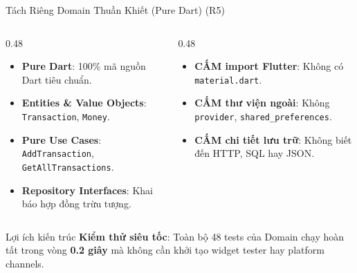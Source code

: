 \documentclass[aspectratio=169, 10pt]{beamer}
\newcommand{\speakerB}{\hfill\tcbox[colback=NavyPrimary,colframe=NavyPrimary,boxsep=1pt,left=3pt,right=3pt,top=1pt,bottom=1pt]{\tiny\bfseries\color{white}SV B: Phạm Nhung}}
\begin{document}
\begin{frame}{Tách Riêng Domain Thuần Khiết (Pure Dart) (R5) \speakerB}
  \begin{columns}[T]
    \begin{column}{0.48\textwidth}
      \begin{tcolorbox}[colback=EmeraldGreen!5, colframe=EmeraldGreen, title=\textbf{Được phép trong Domain}, arc=1.5mm, fonttitle=\scriptsize\bfseries]
        \begin{itemize}\setlength{\itemsep}{3pt}\scriptsize
          \item \textbf{Pure Dart}: 100\% mã nguồn Dart tiêu chuẩn.
          \item \textbf{Entities \& Value Objects}: \texttt{Transaction}, \texttt{Money}.
          \item \textbf{Pure Use Cases}: \texttt{AddTransaction}, \texttt{GetAllTransactions}.
          \item \textbf{Repository Interfaces}: Khai báo hợp đồng trừu tượng.
        \end{itemize}
      \end{tcolorbox}
    \end{column}

    \begin{column}{0.48\textwidth}
      \begin{tcolorbox}[colback=RoseDanger!5, colframe=RoseDanger, title=\textbf{Tuyệt đối cấm trong Domain}, arc=1.5mm, fonttitle=\scriptsize\bfseries]
        \begin{itemize}\setlength{\itemsep}{3pt}\scriptsize
          \item \textbf{CẤM import Flutter}: Không có \texttt{material.dart}.
          \item \textbf{CẤM thư viện ngoài}: Không \texttt{provider}, \texttt{shared\_preferences}.
          \item \textbf{CẤM chi tiết lưu trữ}: Không biết đến HTTP, SQL hay JSON.
        \end{itemize}
      \end{tcolorbox}
    \end{column}
  \end{columns}
  \vspace{1mm}
  \begin{infobox}[IndigoAccent]{Lợi ích kiến trúc}
    \scriptsize \textbf{Kiểm thử siêu tốc}: Toàn bộ 48 tests của Domain chạy hoàn tất trong vòng \textbf{0.2 giây} mà không cần khởi tạo widget tester hay platform channels.
  \end{infobox}
\end{frame}
\end{document}

